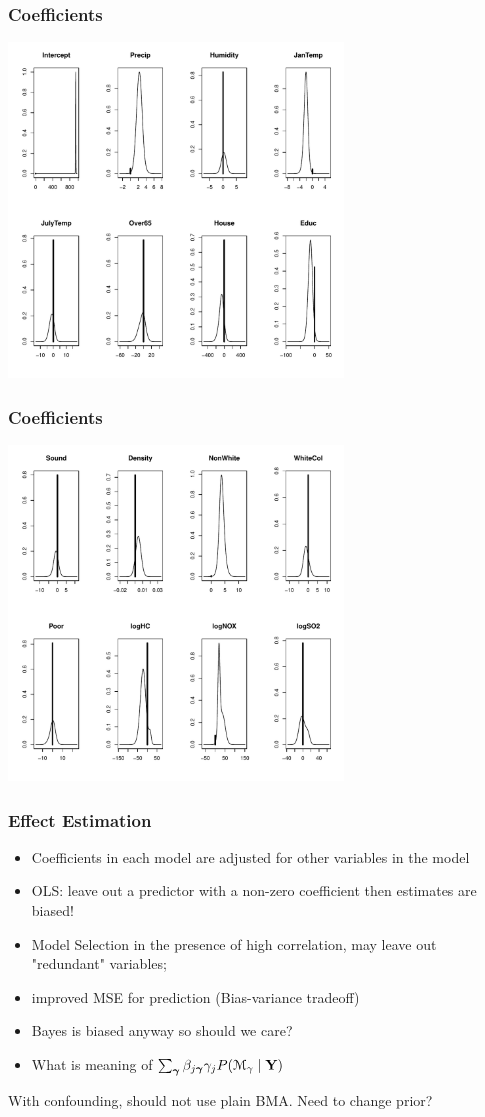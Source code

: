 \documentclass[handout]{beamer}
\begin{document}
\begin{frame}\frametitle{Coefficients}
  \includegraphics[height=3.5in]{mort-beta1}
\end{frame}

\begin{frame}\frametitle{Coefficients}
  \includegraphics[height=3.5in]{mort-beta2}
\end{frame}

\begin{frame}
  \frametitle{Effect Estimation}
  \begin{itemize}
  \item  Coefficients in each model are adjusted for other variables
    in the model
\item OLS:  leave out a predictor with a non-zero coefficient then
  estimates are biased!
\item Model Selection in the presence of high correlation, may leave
  out "redundant" variables; 
\item improved MSE for prediction (Bias-variance tradeoff)
\item Bayes is biased anyway so should we care?
\item What is meaning of $\sum_{\boldsymbol{\gamma}} \beta_{j \boldsymbol{\gamma}} \gamma_j P({\cal M}_\gamma \mid \mathbf{Y})$
  \end{itemize}
  With confounding, should not use plain BMA.  Need to change prior?

\end{frame}
\end{document}
